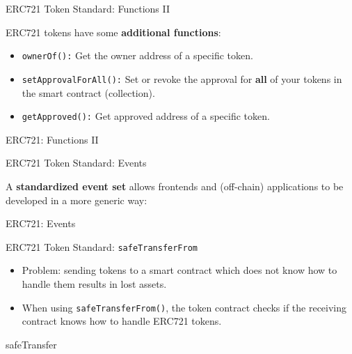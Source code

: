 \documentclass[]{beamer}
\begin{document}
\begin{frame}{ERC721 Token Standard: Functions II}

ERC721 tokens have some \textbf{additional functions}:

\begin{itemize}
	\item<2-> \texttt{ownerOf():} {Get the owner address of a specific token.}
	\item<3-> \texttt{setApprovalForAll():} {Set or revoke the approval for \textbf{all} of your tokens in the smart contract (collection).}
	\item<4-> \texttt{getApproved():} {Get approved address of a specific token.}	
\end{itemize}

\vspace{1em}
	\begin{samplecode}{ERC721: Functions II}
		
	\end{samplecode}
\end{frame}

\begin{frame}{ERC721 Token Standard: Events}

	A \textbf{standardized event set} allows frontends and (off-chain) applications to be developed in a more generic way:
\vspace{1em}
	\begin{samplecode}{ERC721: Events}
		
	\end{samplecode}
\end{frame}

\begin{frame}{ERC721 Token Standard: \texttt{safeTransferFrom}}

\begin{itemize}
	\item Problem: sending tokens to a smart contract which does not know how to handle them results in lost assets.
	\item When using \texttt{safeTransferFrom()}, the token contract checks if the receiving contract knows how to handle ERC721 tokens. 
\end{itemize}
\vspace{1em}
	\begin{samplecode}{safeTransfer}
		
	\end{samplecode}
\end{frame}
\end{document}
